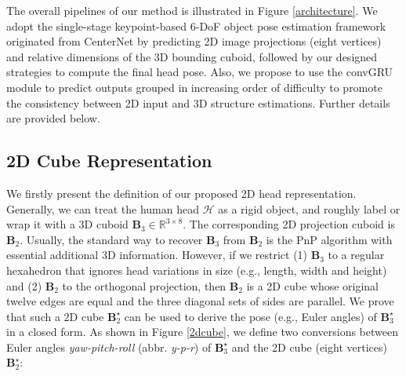 \documentclass{article}
\begin{document}
The overall pipelines of our method is illustrated in Figure \ref{architecture}. We adopt the single-stage keypoint-based 6-DoF object pose estimation framework originated from CenterNet \cite{zhou2019objects} by predicting 2D image projections (eight vertices) and relative dimensions of the 3D bounding cuboid, followed by our designed strategies to compute the final head pose. Also, we propose to use the convGRU module \cite{ballas2016delving, gao2022monocular} to predict outputs grouped in increasing order of difficulty to promote the consistency between 2D input and 3D structure estimations. Further details are provided below.


\subsection{2D Cube Representation}

We firstly present the definition of our proposed 2D head representation. Generally, we can treat the human head $\mathcal{H}$ as a rigid object, and roughly label or wrap it with a 3D cuboid $\mathbf{B}_3\in\mathbb{R}^{3\times8}$. The corresponding 2D projection cuboid is $\mathbf{B}_2$. Usually, the standard way to recover $\mathbf{B}_3$ from $\mathbf{B}_2$ is the PnP algorithm \cite{lepetit2009epnp} with essential additional 3D information. However, if we restrict (1) $\mathbf{B}_3$ to a regular hexahedron that ignores head variations in size (e.g., length, width and height) and (2) $\mathbf{B}_2$ to the orthogonal projection, then $\mathbf{B}_2$ is a 2D cube whose original twelve edges are equal and the three diagonal sets of sides are parallel. We prove that such a 2D cube $\mathbf{B}^\star_2$ can be used to derive the pose (e.g., Euler angles) of $\mathbf{B}^\star_3$ in a closed form. As shown in Figure \ref{2dcube}, we define two conversions between Euler angles {\it yaw-pitch-roll} (abbr. {\it y-p-r}) of $\mathbf{B}^\star_3$ and the 2D cube (eight vertices) $\mathbf{B}^\star_2$:
\end{document}
